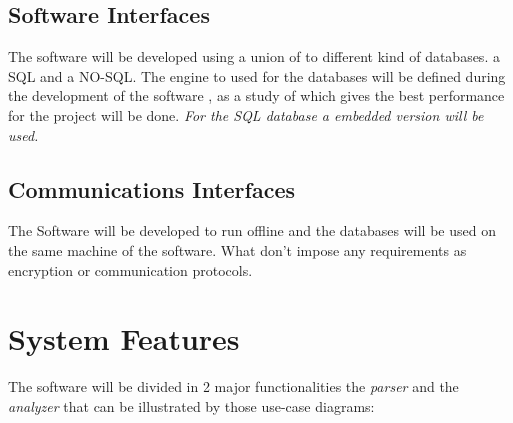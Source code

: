 \documentclass{scrreprt}
\begin{document}
 \section{Software Interfaces}
 The software will be developed using a union of to different kind of databases.
a SQL and a NO-SQL. The engine to used for the databases will be defined during the
development of the software , as a study of which gives the best performance for
the project will be done.
\textit{For the SQL database a embedded version will be used.}

\section{Communications Interfaces}
The Software will be developed to run offline and the databases will be used on
the same machine of the software. What don't impose any requirements as
encryption or communication protocols.

\chapter{System Features}
The software will be divided in 2 major functionalities the \textit{parser}  and
the \textit{analyzer} that can be illustrated by those use-case diagrams:\\
\end{document}
